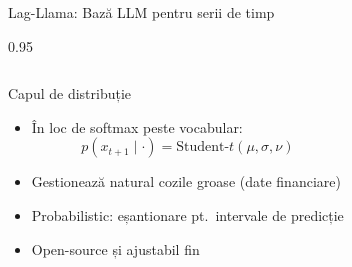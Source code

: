 \documentclass[9pt, aspectratio=169, t]{beamer}
\begin{document}
\begin{frame}{Lag-Llama: Bază LLM pentru serii de timp}
\begin{cminipage}{0.95\textwidth}
{\begin{columns}[T]
        \begin{alertblock}{Capul de distribuție}
            \begin{itemize}\setlength{\itemsep}{0pt}
                \item În loc de softmax peste vocabular:
                \vspace{-2mm}
                $$p(x_{t+1} \mid \cdot) = \text{Student-}t(\mu, \sigma, \nu)$$
                \vspace{-4mm}
                \item Gestionează natural cozile groase (date financiare)
                \item Probabilistic: eșantionare pt.\ intervale de predicție
                \item Open-source și ajustabil fin
            \end{itemize}
        \end{alertblock}
    \end{columns}
    }
    \end{cminipage}
\end{frame}
\end{document}
